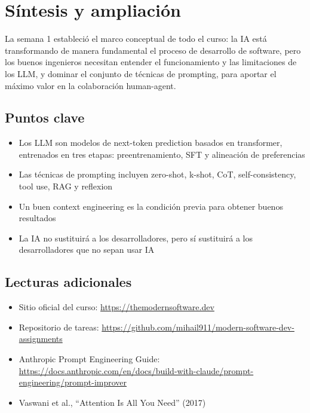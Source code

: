 \section{Síntesis y ampliación}

La semana 1 estableció el marco conceptual de todo el curso: la IA está transformando de manera fundamental el proceso de desarrollo de software, pero los buenos ingenieros necesitan entender el funcionamiento y las limitaciones de los LLM, y dominar el conjunto de técnicas de prompting, para aportar el máximo valor en la colaboración human-agent.

\subsection{Puntos clave}

\begin{itemize}
    \item Los LLM son modelos de next-token prediction basados en transformer, entrenados en tres etapas: preentrenamiento, SFT y alineación de preferencias
    \item Las técnicas de prompting incluyen zero-shot, k-shot, CoT, self-consistency, tool use, RAG y reflexion
    \item Un buen context engineering es la condición previa para obtener buenos resultados
    \item La IA no sustituirá a los desarrolladores, pero sí sustituirá a los desarrolladores que no sepan usar IA
\end{itemize}

\subsection{Lecturas adicionales}

\begin{itemize}
    \item Sitio oficial del curso: \url{https://themodernsoftware.dev}
    \item Repositorio de tareas: \url{https://github.com/mihail911/modern-software-dev-assignments}
    \item Anthropic Prompt Engineering Guide: \url{https://docs.anthropic.com/en/docs/build-with-claude/prompt-engineering/prompt-improver}
    \item Vaswani et al., ``Attention Is All You Need'' (2017)
\end{itemize}



